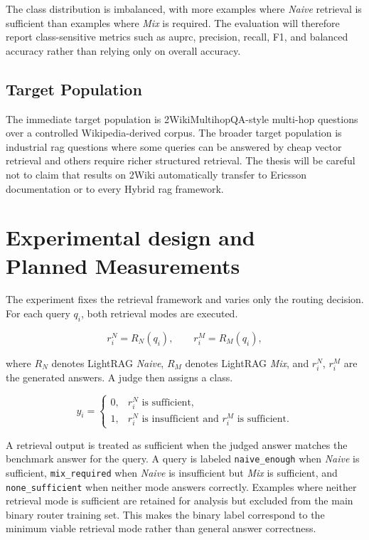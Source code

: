 \documentclass[english, bibtex]{kththesis}               %
\numberwithin{listing}{chapter}
\begin{document}
The class distribution is imbalanced, with more examples where \emph{Naive} retrieval is sufficient than examples where \emph{Mix} is required. The evaluation will therefore report class-sensitive metrics such as \gls{auprc}, precision, recall, F1, and balanced accuracy rather than relying only on overall accuracy.

\subsection{Target Population}

The immediate target population is 2WikiMultihopQA-style multi-hop questions over a controlled Wikipedia-derived corpus. The broader target population is industrial \gls{rag} questions where some queries can be answered by cheap vector retrieval and others require richer structured retrieval. The thesis will be careful not to claim that results on 2Wiki automatically transfer to Ericsson documentation or to every Hybrid \gls{rag} framework.

\section[Experimental design/Planned Measurements]{Experimental design and\\Planned Measurements}
\label{sec:experimentalDesign}

The experiment fixes the retrieval framework and varies only the routing decision. For each query \(q_i\), both retrieval modes are executed.

\begin{equation}
\label{eq:dualModeOutputs}
r_i^{N} = R_N(q_i),
\qquad
r_i^{M} = R_M(q_i),
\end{equation}

where \(R_N\) denotes LightRAG \emph{Naive}, \(R_M\) denotes LightRAG \emph{Mix}, and \(r_i^N\), \(r_i^M\) are the generated answers. A judge then assigns a class.

\begin{equation}
\label{eq:routingLabel}
y_i =
\begin{cases}
0, & r_i^N \text{ is sufficient},\\
1, & r_i^N \text{ is insufficient and } r_i^M \text{ is sufficient}.
\end{cases}
\end{equation}

A retrieval output is treated as sufficient when the judged answer matches the benchmark answer for the query. A query is labeled \texttt{naive\_enough} when \emph{Naive} is sufficient, \texttt{mix\_required} when \emph{Naive} is insufficient but \emph{Mix} is sufficient, and \texttt{none\_sufficient} when neither mode answers correctly. Examples where neither retrieval mode is sufficient are retained for analysis but excluded from the main binary router training set. This makes the binary label correspond to the minimum viable retrieval mode rather than general answer correctness.
\end{document}
